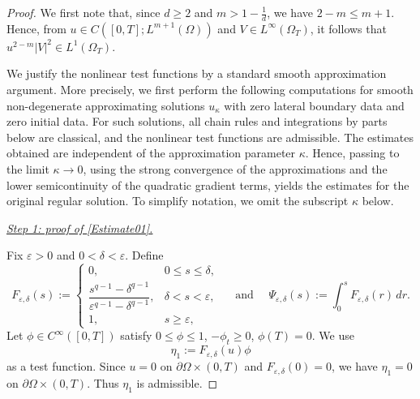 \documentclass[10pt,a4paper]{amsart}
\begin{document}
\begin{proof}
We first note that, since $d\ge2$ and $m>1-\frac1d$, we have
$2-m\le m+1$. Hence, from
$u\in C([0,T];L^{m+1}(\Omega))$ and $V\in L^\infty(\Omega_T)$, it follows that $u^{2-m}|V|^2\in L^1(\Omega_T)$.

We justify the nonlinear test functions by a standard smooth approximation argument. More precisely, we first perform the following computations for smooth non-degenerate approximating solutions $u_\kappa$ with zero lateral boundary data and zero initial data. For such solutions, all chain rules and integrations by parts below are classical, and the nonlinear test functions are admissible. The estimates obtained are independent of the approximation parameter $\kappa$. Hence, passing to the limit $\kappa\to0$, using the strong convergence of the approximations and the lower semicontinuity of the quadratic gradient terms, yields the estimates for the original regular solution. To simplify notation, we omit the subscript $\kappa$ below.






\smallskip
\noindent
\underline{\emph{Step 1: proof of \eqref{Estimate01}.}}

Fix $\varepsilon>0$ and $0<\delta<\varepsilon$. Define
\[
F_{\varepsilon,\delta}(s):=
\begin{cases}
0, & 0\le s\le \delta,\\[1mm]
\dfrac{s^{q-1}-\delta^{q-1}}
{\varepsilon^{q-1}-\delta^{q-1}},
& \delta<s<\varepsilon,\\[3mm]
1, & s\ge \varepsilon,
\end{cases} 
\quad \text{ and }
\quad 
\Psi_{\varepsilon,\delta}(s)
:=
\int_0^sF_{\varepsilon,\delta}(r)\,dr.
\]
Let $\phi\in C^\infty([0,T])$ satisfy $0\le \phi\le1$, $-\phi_t\ge0$, $\phi(T)=0$.
We use
\[
\eta_1:=F_{\varepsilon,\delta}(u)\phi
\]
as a test function. Since $u=0$ on $\partial\Omega\times(0,T)$ and
$F_{\varepsilon,\delta}(0)=0$, we have $\eta_1=0$ on $\partial\Omega\times(0,T)$.
Thus $\eta_1$ is admissible.


\end{proof}
\end{document}
